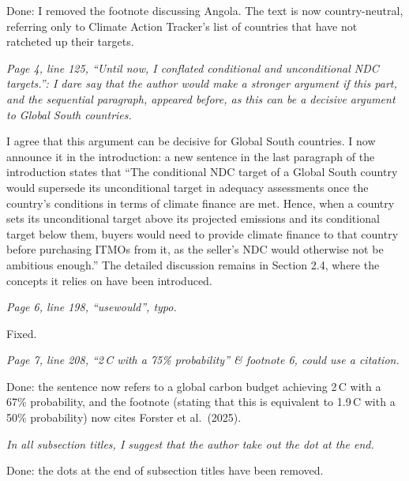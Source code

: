 \documentclass[11pt]{article}
\newenvironment{italic}{\itshape}{\par}
\begin{document}
Done: I removed the footnote discussing Angola. The text is now country-neutral, referring only to Climate Action Tracker's list of countries that have not ratcheted up their targets.



\begin{italic}
Page 4, line 125, ``Until now, I conflated conditional and unconditional NDC targets.'': I dare say that the author would make a stronger argument if this part, and the sequential paragraph, appeared before, as this can be a decisive argument to Global South countries.
\end{italic}

I agree that this argument can be decisive for Global South countries. I now announce it in the introduction: a new sentence in the last paragraph of the introduction states that ``The conditional NDC target of a Global South country would supersede its unconditional target in adequacy assessments once the country's conditions in terms of climate finance are met. Hence, when a country sets its unconditional target above its projected emissions and its conditional target below them, buyers would need to provide climate finance to that country before purchasing ITMOs from it, as the seller's NDC would otherwise not be ambitious enough.'' 
The detailed discussion remains in Section 2.4, where the concepts it relies on have been introduced.


\begin{italic}
Page 6, line 198, ``usewould'', typo.
\end{italic}

Fixed.



\begin{italic}
Page 7, line 208, ``2\,\textdegree C with a 75\% probability'' \& footnote 6, could use a citation.
\end{italic}

Done: the sentence now refers to a global carbon budget achieving 2\,\textdegree C with a 67\% probability, and the footnote (stating that this is equivalent to 1.9\,\textdegree C with a 50\% probability) now cites Forster et al.\ (2025).



\begin{italic}
In all subsection titles, I suggest that the author take out the dot at the end.
\end{italic}

Done: the dots at the end of subsection titles have been removed.
\end{document}
